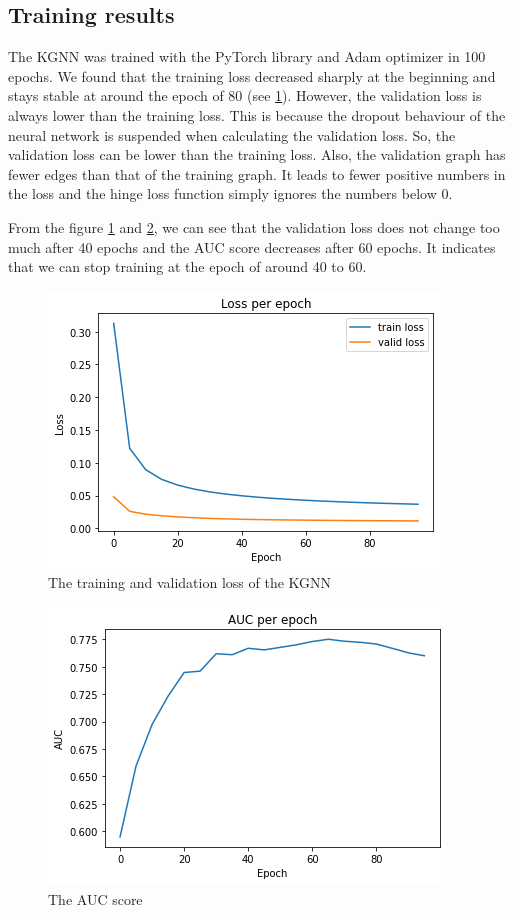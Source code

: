 \documentclass[11pt,twoside]{report}
\begin{document}
\subsection{Training results}
The KGNN was trained with the PyTorch library and Adam optimizer in 100 epochs. We found that the training loss decreased sharply at the beginning and stays stable at around the epoch of 80 (see \ref{fig:training_loss}). However, the validation loss is always lower than the training loss. This is because the dropout behaviour of the neural network is suspended when calculating the validation loss. So, the validation loss can be lower than the training loss. Also, the validation graph has fewer edges than that of the training graph. It leads to fewer positive numbers in the loss and the hinge loss function simply ignores the numbers below 0. 

From the figure \ref{fig:training_loss} and \ref{fig:auc}, we can see that the validation loss does not change too much after 40 epochs and the AUC score decreases after 60 epochs. It indicates that we can stop training at the epoch of around 40 to 60.

\begin{figure}[H]
    \centering
    \includegraphics[scale=0.9]{loss.png}
    \caption{The training and validation loss of the KGNN}
    \label{fig:training_loss}
\end{figure}

\begin{figure}[H]
    \centering
    \includegraphics[scale=0.9]{auc.png}
    \caption{The AUC score}
    \label{fig:auc}
\end{figure}
\end{document}
